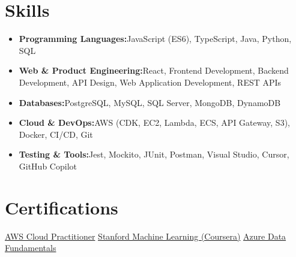\documentclass[a4paper,10pt]{article}
\newcommand{\resumeItem}[2]{\item{\textbf{#1}{\hspace{0.5mm}#2 \vspace{-0.5mm}}}}
\newcommand{\resumeSubItem}[2]{\resumeItem{#1}{#2}\vspace{-3pt}}
\newcommand{\resumeHeadingSkillStart}{\begin{itemize}[leftmargin=*, itemsep=0.6mm, rightmargin=2ex]}
\newcommand{\resumeHeadingSkillEnd}{\end{itemize}\vspace{-2mm}}
\begin{document}
\section{\textbf{Skills}}
\resumeHeadingSkillStart
\resumeSubItem{Programming Languages:}{JavaScript (ES6), TypeScript, Java, Python, SQL}
\resumeSubItem{Web \& Product Engineering:}{React, Frontend Development, Backend Development, API Design, Web Application Development, REST APIs}
\resumeSubItem{Databases:}{PostgreSQL, MySQL, SQL Server, MongoDB, DynamoDB}
\resumeSubItem{Cloud \& DevOps:}{AWS (CDK, EC2, Lambda, ECS, API Gateway, S3), Docker, CI/CD, Git}
\resumeSubItem{Testing \& Tools:}{Jest, Mockito, JUnit, Postman, Visual Studio, Cursor, GitHub Copilot}
\resumeHeadingSkillEnd
\vspace{0mm}

\section{\textbf{Certifications}}
\footnotesize{
\href{https://drive.google.com/file/d/1a3exoiS79RS3q8vSJHT-PpkczSPg54EZ/view}{AWS Cloud Practitioner} \hfill \href{https://drive.google.com/file/d/1At3BLkqJ9vuhPPUCcrNAw9yNH5li7XdQ/view}{Stanford Machine Learning (Coursera)} \hfill \href{https://drive.google.com/file/d/1VBJjfRMsIm8BckoUtLUV7ZbY88Jju2qT/view}{Azure Data Fundamentals}
}
\end{document}
